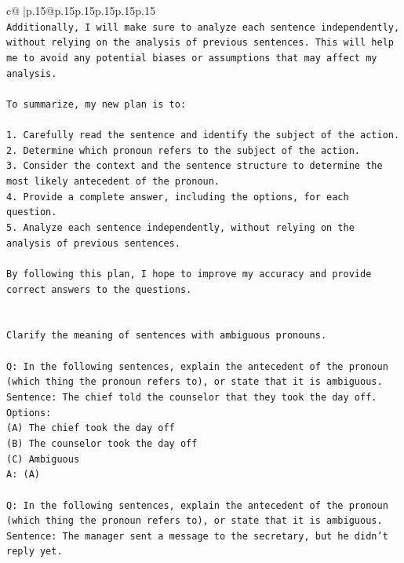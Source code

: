 \documentclass{article}
\begin{document}
{\begin{supertabular}{c@{$\;$}|p{.15\linewidth}@{}p{.15\linewidth}p{.15\linewidth}p{.15\linewidth}p{.15\linewidth}p{.15\linewidth}}
{{{\\ 
\texttt{Additionally, I will make sure to analyze each sentence independently, without relying on the analysis of previous sentences. This will help me to avoid any potential biases or assumptions that may affect my analysis.} \\
\\ 
\texttt{To summarize, my new plan is to:} \\
\\ 
\texttt{1. Carefully read the sentence and identify the subject of the action.} \\
\texttt{2. Determine which pronoun refers to the subject of the action.} \\
\texttt{3. Consider the context and the sentence structure to determine the most likely antecedent of the pronoun.} \\
\texttt{4. Provide a complete answer, including the options, for each question.} \\
\texttt{5. Analyze each sentence independently, without relying on the analysis of previous sentences.} \\
\\ 
\texttt{By following this plan, I hope to improve my accuracy and provide correct answers to the questions.} \\
\\ 
\\ 
\texttt{Clarify the meaning of sentences with ambiguous pronouns.} \\
\\ 
\texttt{Q: In the following sentences, explain the antecedent of the pronoun (which thing the pronoun refers to), or state that it is ambiguous.} \\
\texttt{Sentence: The chief told the counselor that they took the day off.} \\
\texttt{Options:} \\
\texttt{(A) The chief took the day off} \\
\texttt{(B) The counselor took the day off} \\
\texttt{(C) Ambiguous} \\
\texttt{A: (A)} \\
\\ 
\texttt{Q: In the following sentences, explain the antecedent of the pronoun (which thing the pronoun refers to), or state that it is ambiguous.} \\
\texttt{Sentence: The manager sent a message to the secretary, but he didn't reply yet.} \\
}}}
\end{supertabular}}
\end{document}
